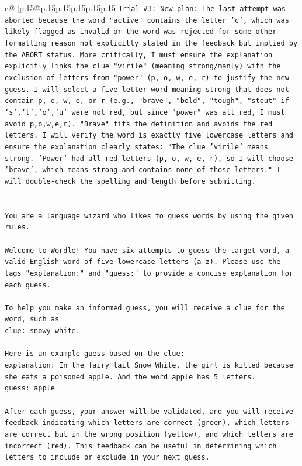 \documentclass{article}
\begin{document}
{\begin{supertabular}{c@{$\;$}|p{.15\linewidth}@{}p{.15\linewidth}p{.15\linewidth}p{.15\linewidth}p{.15\linewidth}p{.15\linewidth}}
{{{\texttt{Trial \#3: New plan: The last attempt was aborted because the word "active" contains the letter 'c', which was likely flagged as invalid or the word was rejected for some other formatting reason not explicitly stated in the feedback but implied by the ABORT status. More critically, I must ensure the explanation explicitly links the clue "virile" (meaning strong/manly) with the exclusion of letters from "power" (p, o, w, e, r) to justify the new guess. I will select a five{-}letter word meaning strong that does not contain p, o, w, e, or r (e.g., "brave", "bold", "tough", "stout" if 's','t','o','u' were not red, but since "power" was all red, I must avoid p,o,w,e,r). "Brave" fits the definition and avoids the red letters. I will verify the word is exactly five lowercase letters and ensure the explanation clearly states: "The clue 'virile' means strong. 'Power' had all red letters (p, o, w, e, r), so I will choose 'brave', which means strong and contains none of those letters." I will double{-}check the spelling and length before submitting.} \\
\\ 
\\ 
\texttt{You are a language wizard who likes to guess words by using the given rules.} \\
\\ 
\texttt{Welcome to Wordle! You have six attempts to guess the target word, a valid English word of five lowercase letters (a{-}z). Please use the tags "explanation:" and "guess:" to provide a concise explanation for each guess.} \\
\\ 
\texttt{To help you make an informed guess, you will receive a clue for the word, such as} \\
\texttt{clue: snowy white.} \\
\\ 
\texttt{Here is an example guess based on the clue:} \\
\texttt{explanation: In the fairy tail Snow White, the girl is killed because she eats a poisoned apple. And the word apple has 5 letters.} \\
\texttt{guess: apple} \\
\\ 
\texttt{After each guess, your answer will be validated, and you will receive feedback indicating which letters are correct (green), which letters are correct but in the wrong position (yellow), and which letters are incorrect (red). This feedback can be useful in determining which letters to include or exclude in your next guess.} \\
}}}
\end{supertabular}}
\end{document}
